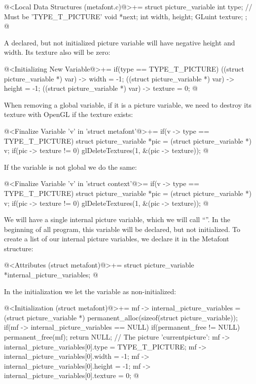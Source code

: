 \iniciocodigo
@<Local Data Structures (metafont.c)@>+=
struct picture_variable{
  int type; // Must be 'TYPE_T_PICTURE'
  void *next;
  int width, height;
  GLuint texture;
};
@
\fimcodigo

A declared, but not initialized picture variable will have negative
height and width. Its texture also will be zero:

\iniciocodigo
@<Initializing New Variable@>+=
if(type == TYPE_T_PICTURE){
  ((struct picture_variable *) var) -> width = -1;
  ((struct picture_variable *) var) -> height = -1;
  ((struct picture_variable *) var) -> texture = 0;
}
@
\fimcodigo

When removing a global variable, if it is a picture variable, we need
to destroy its texture with OpenGL if the texture exists:

\iniciocodigo
@<Finalize Variable 'v' in 'struct metafont'@>+=
if(v -> type == TYPE_T_PICTURE){
  struct picture_variable *pic = (struct picture_variable *) v;
  if(pic -> texture != 0)
    glDeleteTextures(1, &(pic -> texture));
}
@
\fimcodigo

If the variable is not global we do the same:

\iniciocodigo
@<Finalize Variable 'v' in 'struct context'@>=
if(v -> type == TYPE_T_PICTURE){
  struct picture_variable *pic = (struct picture_variable *) v;
  if(pic -> texture != 0)
    glDeleteTextures(1, &(pic -> texture));
}
@
\fimcodigo

We will have a single internal picture variable, which we will call
``''. In the beginning of all program, this
variable will be declared, but not initialized. To create a list of
our internal picture variables, we declare it in the Metafont
structure:

\iniciocodigo
@<Attributes (struct metafont)@>+=
struct picture_variable *internal_picture_variables;
@
\fimcodigo

In the initialization we let the variable as non-initialized:

\iniciocodigo
@<Initialization (struct metafont)@>+=
mf -> internal_picture_variables = (struct picture_variable *)
                                   permanent_alloc(sizeof(struct picture_variable));
if(mf -> internal_picture_variables == NULL){
  if(permanent_free != NULL)
    permanent_free(mf);
  return NULL;
}
// The picture 'currentpicture':
mf -> internal_picture_variables[0].type = TYPE_T_PICTURE;
mf -> internal_picture_variables[0].width = -1;
mf -> internal_picture_variables[0].height = -1;
mf -> internal_picture_variables[0].texture = 0;
@
\fimcodigo

